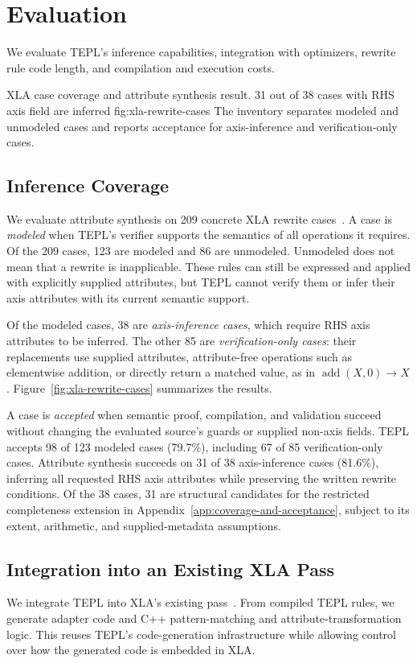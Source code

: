 \section{Evaluation}
\label{sec:evaluation}
We evaluate TEPL’s inference capabilities, integration with optimizers, rewrite rule code length, and compilation and execution costs.


{XLA case coverage and attribute synthesis result. 31 out of 38 cases with RHS axis field are inferred}
{fig:xla-rewrite-cases}
{The inventory separates modeled and unmodeled cases and reports
acceptance for axis-inference and verification-only cases.}

\subsection{Inference Coverage}
\label{sec:inference-coverage}
We evaluate attribute synthesis on 209 concrete XLA rewrite
cases~\cite{xla-evaluation-source}. A case is \emph{modeled} when
TEPL's verifier supports the semantics of all operations it requires.
Of the 209 cases, 123 are modeled and 86 are unmodeled.
Unmodeled does not mean that a rewrite is inapplicable.
These rules can still be expressed and applied with explicitly supplied
attributes, but TEPL cannot verify them or infer their axis attributes
with its current semantic support.

Of the modeled cases, 38 are \emph{axis-inference cases}, which require
RHS axis attributes to be inferred. The other 85 are
\emph{verification-only cases}: their replacements use supplied attributes,
attribute-free operations such as elementwise addition, or directly
return a matched value, as in $\operatorname{add}(X,0)\to X$.
Figure~\ref{fig:xla-rewrite-cases} summarizes the results.

A case is \emph{accepted} when semantic proof, compilation, and
validation succeed without changing the evaluated source's guards or
supplied non-axis fields. TEPL accepts 98 of 123 modeled cases (79.7\%),
including 67 of 85 verification-only cases.
Attribute synthesis succeeds on 31 of 38 axis-inference cases
(81.6\%), inferring all requested RHS axis attributes while preserving
the written rewrite conditions. Of the 38 cases, 31 are structural candidates
for the restricted completeness extension in Appendix~\ref{app:coverage-and-acceptance},
subject to its extent, arithmetic, and supplied-metadata assumptions.

\subsection{Integration into an Existing XLA Pass}
\label{sec:integration-into-an-existing-xla-pass}
We integrate TEPL into XLA's existing 
pass~\cite{xla-evaluation-source}. From compiled TEPL rules, we generate
adapter code and C++ pattern-matching and attribute-transformation logic.
This reuses TEPL's code-generation infrastructure while allowing
control over how the generated code is embedded in XLA.

